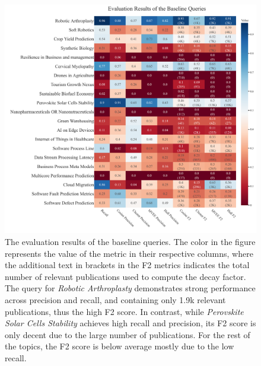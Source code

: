 \documentclass[%
  a4paper,fontsize=11pt,abstract=on,%
  oneside,BCOR=19mm,%
  final %
]{scrreprt}
\begin{document}
\begin{figure}[!h]
	\hspace*{-4cm}	
	\includegraphics[scale=0.6]{pics/baseline_results.pdf}
	\caption[Baseline Queries Results]{The evaluation results of the baseline queries. The color in the figure represents the value of the metric in their respective columns, where the additional text in brackets in the F2 metrics indicates the total number of relevant publications used to compute the decay factor. The query for \textit{Robotic Arthroplasty} demonstrates strong performance across precision and recall, and containing only 1.9k relevant publications, thus the high F2 score. In contrast, while \textit{Perovskite Solar Cells Stability} achieves high recall and precision, its F2 score is only decent due to the large number of publications. For the rest of the topics, the F2 score is below average mostly due to the low recall.}\label{fig:baseline-results}
\end{figure}
\end{document}
